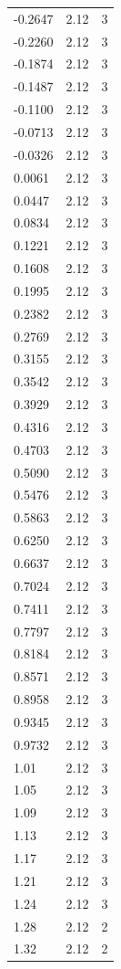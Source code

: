 \begin{longtable}{lrr}
  -0.2647 & 2.12 & 3 \\
  -0.2260 & 2.12 & 3 \\
  -0.1874 & 2.12 & 3 \\
  -0.1487 & 2.12 & 3 \\
  -0.1100 & 2.12 & 3 \\
  -0.0713 & 2.12 & 3 \\
  -0.0326 & 2.12 & 3 \\
  0.0061 & 2.12 & 3 \\
  0.0447 & 2.12 & 3 \\
  0.0834 & 2.12 & 3 \\
  0.1221 & 2.12 & 3 \\
  0.1608 & 2.12 & 3 \\
  0.1995 & 2.12 & 3 \\
  0.2382 & 2.12 & 3 \\
  0.2769 & 2.12 & 3 \\
  0.3155 & 2.12 & 3 \\
  0.3542 & 2.12 & 3 \\
  0.3929 & 2.12 & 3 \\
  0.4316 & 2.12 & 3 \\
  0.4703 & 2.12 & 3 \\
  0.5090 & 2.12 & 3 \\
  0.5476 & 2.12 & 3 \\
  0.5863 & 2.12 & 3 \\
  0.6250 & 2.12 & 3 \\
  0.6637 & 2.12 & 3 \\
  0.7024 & 2.12 & 3 \\
  0.7411 & 2.12 & 3 \\
  0.7797 & 2.12 & 3 \\
  0.8184 & 2.12 & 3 \\
  0.8571 & 2.12 & 3 \\
  0.8958 & 2.12 & 3 \\
  0.9345 & 2.12 & 3 \\
  0.9732 & 2.12 & 3 \\
  1.01 & 2.12 & 3 \\
  1.05 & 2.12 & 3 \\
  1.09 & 2.12 & 3 \\
  1.13 & 2.12 & 3 \\
  1.17 & 2.12 & 3 \\
  1.21 & 2.12 & 3 \\
  1.24 & 2.12 & 3 \\
  1.28 & 2.12 & 2 \\
  1.32 & 2.12 & 2 \\

\end{longtable}
